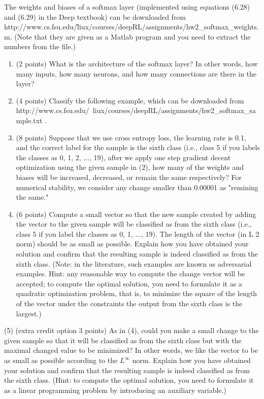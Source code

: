 \documentclass[
	12pt, %
]{../Template/fphw}
\begin{document}
\begin{problem}
The weights and biases of a softmax layer (implemented using equations (6.28) and (6.29)
in
the
Deep
textbook)
can
be
downloaded
from
http://www.cs.fsu.edu/\~liux/courses/deepRL/assignments/hw2\_softmax\_weights.m. (Note that they are given as a
Matlab program and you need to extract the numbers from the file.)
\begin{enumerate}[label=(\arabic*)]
\item (2 points) What is the architecture of the softmax layer? In other words, how many inputs, how many
neurons, and how many connections are there in the layer?
\item (4
points)
Classify
the
following
example,
which
can
be
downloaded
from
http://www.cs.fsu.edu/~liux/courses/deepRL/assignments/hw2\_softmax\_sample.txt .
\item (8 points) Suppose that we use cross entropy loss, the learning rate is 0.1, and the correct label for the
sample is the sixth class (i.e., class 5 if you labels the classes as 0, 1, 2, ..., 19), after we apply one step
gradient decent optimization using the given sample in (2), how many of the weights and biases will be
increased, decreased, or remain the same respectively? For numerical stability, we consider any change
smaller than 0.00001 as "remining the same."
\item (6 points) Compute a small vector so that the new sample created by adding the vector to the given sample
will be classified as from the sixth class (i.e., class 5 if you label the classes as 0, 1, ..., 19). The length of
the vector (in L 2 norm) should be as small as possible. Explain how you have obtained your solution and
confirm that the resulting sample is indeed classified as from the sixth class. (Note: in the literature, such
examples are known as adversarial examples. Hint: any reasonable way to compute the change vector will
be accepted; to compute the optimal solution, you need to formulate it as a quadratic optimization problem,
that is, to minimize the square of the length of the vector under the constraints the output from the sixth
class is the largest.)
\end{enumerate}


\end{problem}

\begin{problem}
    (5) (extra credit option 3 points) As in (4), could you make a small change to the given sample so that it will
be classified as from the sixth class but with the maximal changed value to be minimized? In other words,
we like the vector to be as small as possible according to the $L^{\infty}$ norm. Explain how you have obtained your
solution and confirm that the resulting sample is indeed classified as from the sixth class. (Hint: to compute
the optimal solution, you need to formulate it as a linear programming problem by introducing an auxiliary
variable.)
\end{problem}
\end{document}
